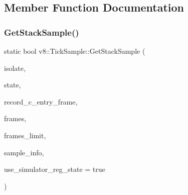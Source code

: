 \subsection{Member Function Documentation}
\mbox{\label{structv8_1_1TickSample_a297e05d112f3c749bfead215393646c1}} 
\subsubsection{\texorpdfstring{Get\+Stack\+Sample()}{GetStackSample()}}
{\footnotesize\ttfamily static bool v8\+::\+Tick\+Sample\+::\+Get\+Stack\+Sample (\begin{DoxyParamCaption}\item[{\mbox{\hyperlink{classv8_1_1Isolate}{Isolate}} $\ast$}]{isolate,  }\item[{\mbox{\hyperlink{structv8_1_1RegisterState}{v8\+::\+Register\+State}} $\ast$}]{state,  }\item[{Record\+C\+Entry\+Frame}]{record\+\_\+c\+\_\+entry\+\_\+frame,  }\item[{void $\ast$$\ast$}]{frames,  }\item[{size\+\_\+t}]{frames\+\_\+limit,  }\item[{\mbox{\hyperlink{structv8_1_1SampleInfo}{v8\+::\+Sample\+Info}} $\ast$}]{sample\+\_\+info,  }\item[{bool}]{use\+\_\+simulator\+\_\+reg\+\_\+state = {\ttfamily true} }\end{DoxyParamCaption})\hspace{0.3cm}{\ttfamily [static]}}

